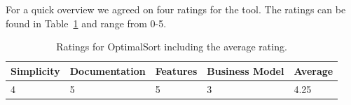 For a quick overview we agreed on four ratings for the tool. The ratings can be
found in Table~\ref{tab:rating-OptimalSort} and range from 0-5.

\begin{table}[h] 
\centering 
\begin{tabularx}{\linewidth}{|X|X|X|X|X|}
\hline
Simplicity & Documentation & Features & Business Model & Average \\ 
\hline 
4 & 5 & 5 & 3 & 4.25 \\ 
\hline 
\end{tabularx} 
\caption[Ratings for OptimalSort] {
Ratings for OptimalSort including the average rating.
} 
\label{tab:rating-OptimalSort}
\end{table}






